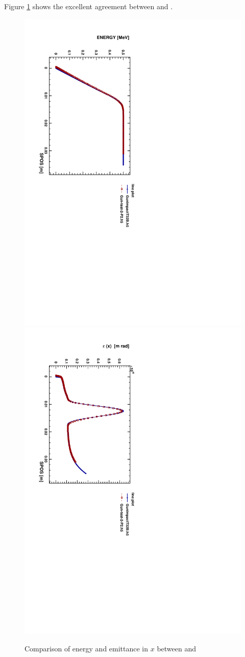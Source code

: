 Figure \ref{fig:guncomp2} shows the excellent agreement between \impactt and \opalt.

\begin{figure}[ht]
 \begin{center} 
   \includegraphics[width=0.60\linewidth,angle=90]{figures/Gun/GunCompEn}
   \includegraphics[width=0.60\linewidth,angle=90]{figures/Gun/GunCompEx}
   \caption{Comparison of energy and emittance in $x$ between \impactt and \opalt}   
   \label{fig:guncomp2}
 \end{center}
\end{figure}

